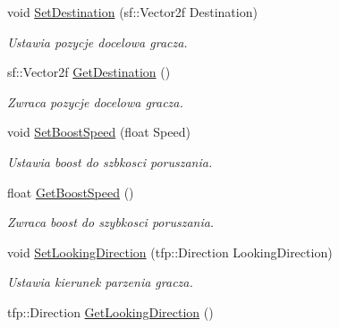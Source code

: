 \begin{DoxyCompactItemize}
void \mbox{\hyperlink{classtfp_1_1_player_a849b97e1007d2e234ce17d106681a992}{Set\+Destination}} (sf\+::\+Vector2f Destination)
\begin{DoxyCompactList}\small\item\em Ustawia pozycje docelowa gracza. \end{DoxyCompactList}\item 
\mbox{\label{classtfp_1_1_player_a9a6550ba33abab92ad6cbf35ee3c9174}} 
sf\+::\+Vector2f \mbox{\hyperlink{classtfp_1_1_player_a9a6550ba33abab92ad6cbf35ee3c9174}{Get\+Destination}} ()
\begin{DoxyCompactList}\small\item\em Zwraca pozycje docelowa gracza. \end{DoxyCompactList}\item 
\mbox{\label{classtfp_1_1_player_a1cf97652344d339f9d920f71caf3761c}} 
void \mbox{\hyperlink{classtfp_1_1_player_a1cf97652344d339f9d920f71caf3761c}{Set\+Boost\+Speed}} (float Speed)
\begin{DoxyCompactList}\small\item\em Ustawia boost do szbkosci poruszania. \end{DoxyCompactList}\item 
\mbox{\label{classtfp_1_1_player_ad344b1e188d18cdf03e63a90e5224da0}} 
float \mbox{\hyperlink{classtfp_1_1_player_ad344b1e188d18cdf03e63a90e5224da0}{Get\+Boost\+Speed}} ()
\begin{DoxyCompactList}\small\item\em Zwraca boost do szybkosci poruszania. \end{DoxyCompactList}\item 
\mbox{\label{classtfp_1_1_player_a414ca8c7b9693aba5e2d510e3b46173d}} 
void \mbox{\hyperlink{classtfp_1_1_player_a414ca8c7b9693aba5e2d510e3b46173d}{Set\+Looking\+Direction}} (tfp\+::\+Direction Looking\+Direction)
\begin{DoxyCompactList}\small\item\em Ustawia kierunek parzenia gracza. \end{DoxyCompactList}\item 
\mbox{\label{classtfp_1_1_player_a4ebb4b5f4f47e13a3bae50ab99ddfdc7}} 
tfp\+::\+Direction \mbox{\hyperlink{classtfp_1_1_player_a4ebb4b5f4f47e13a3bae50ab99ddfdc7}{Get\+Looking\+Direction}} ()

\end{DoxyCompactItemize}
